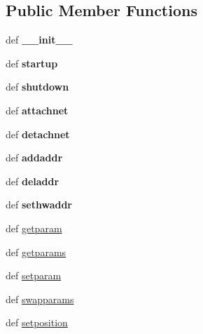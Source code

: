 \subsection*{Public Member Functions}
\begin{DoxyCompactItemize}
\item 
\hypertarget{classcore_1_1coreobj_1_1_py_core_net_if_afa821d304555f1cd6a89a00712ec719c}{def {\bfseries \+\_\+\+\_\+init\+\_\+\+\_\+}}\label{classcore_1_1coreobj_1_1_py_core_net_if_afa821d304555f1cd6a89a00712ec719c}

\item 
\hypertarget{classcore_1_1coreobj_1_1_py_core_net_if_a42930beccbfd5d9b6eee1dc0b1b0401f}{def {\bfseries startup}}\label{classcore_1_1coreobj_1_1_py_core_net_if_a42930beccbfd5d9b6eee1dc0b1b0401f}

\item 
\hypertarget{classcore_1_1coreobj_1_1_py_core_net_if_aa985b5b76a7e499f2e429e827887e3b8}{def {\bfseries shutdown}}\label{classcore_1_1coreobj_1_1_py_core_net_if_aa985b5b76a7e499f2e429e827887e3b8}

\item 
\hypertarget{classcore_1_1coreobj_1_1_py_core_net_if_aa931986cbcd356236471ec3dd6124c28}{def {\bfseries attachnet}}\label{classcore_1_1coreobj_1_1_py_core_net_if_aa931986cbcd356236471ec3dd6124c28}

\item 
\hypertarget{classcore_1_1coreobj_1_1_py_core_net_if_a2d15e65cee5fe1adb5ded7b9d599e024}{def {\bfseries detachnet}}\label{classcore_1_1coreobj_1_1_py_core_net_if_a2d15e65cee5fe1adb5ded7b9d599e024}

\item 
\hypertarget{classcore_1_1coreobj_1_1_py_core_net_if_a216ce0ed98c33385df4c0ebfc4653b7f}{def {\bfseries addaddr}}\label{classcore_1_1coreobj_1_1_py_core_net_if_a216ce0ed98c33385df4c0ebfc4653b7f}

\item 
\hypertarget{classcore_1_1coreobj_1_1_py_core_net_if_a6d31c5c9f2f1b6646fd2c44a1699bad8}{def {\bfseries deladdr}}\label{classcore_1_1coreobj_1_1_py_core_net_if_a6d31c5c9f2f1b6646fd2c44a1699bad8}

\item 
\hypertarget{classcore_1_1coreobj_1_1_py_core_net_if_aa2da5b06cd43455bbd7314a49fbc59c7}{def {\bfseries sethwaddr}}\label{classcore_1_1coreobj_1_1_py_core_net_if_aa2da5b06cd43455bbd7314a49fbc59c7}

\item 
def \hyperlink{classcore_1_1coreobj_1_1_py_core_net_if_a50edc1ce70494cb8bec09bfa23110b67}{getparam}
\item 
def \hyperlink{classcore_1_1coreobj_1_1_py_core_net_if_a13d1e888e35dedea8ba1d8680c62daf0}{getparams}
\item 
def \hyperlink{classcore_1_1coreobj_1_1_py_core_net_if_a7e0c50d41f8f80195bda0d52c6059837}{setparam}
\item 
def \hyperlink{classcore_1_1coreobj_1_1_py_core_net_if_a8bbd4715bef27350185dc87c5b35d043}{swapparams}
\item 
def \hyperlink{classcore_1_1coreobj_1_1_py_core_net_if_a9adce1c29167b9684a12ca0eacfb350e}{setposition}
\end{DoxyCompactItemize}
